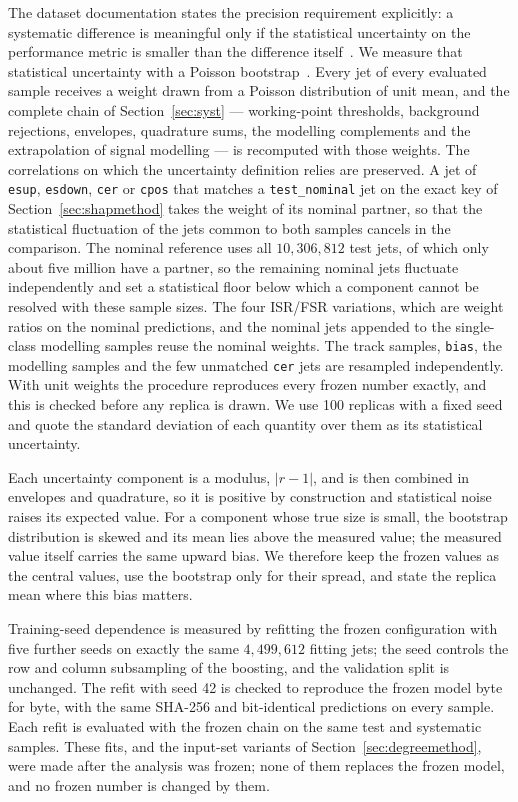 \documentclass[pdflatex,sn-mathphys,Numbered,iicol]{sn-jnl}
\begin{document}
The dataset documentation states the precision requirement explicitly: a systematic
difference is meaningful only if the statistical uncertainty on the performance metric
is smaller than the difference itself~\cite{ATLASGitLab}. We measure that statistical
uncertainty with a Poisson bootstrap~\cite{Efron1979,Hanley2006}. Every jet of every
evaluated sample receives a weight drawn from a Poisson distribution of unit mean, and
the complete chain of Section~\ref{sec:syst} --- working-point thresholds, background
rejections, envelopes, quadrature sums, the modelling complements and the extrapolation
of signal modelling --- is recomputed with those weights. The correlations on which the
uncertainty definition relies are preserved. A jet of \texttt{esup}, \texttt{esdown},
\texttt{cer} or \texttt{cpos} that matches a \texttt{test\_nominal} jet on the exact key
of Section~\ref{sec:shapmethod} takes the weight of its nominal partner, so that the statistical fluctuation of the
jets common to both samples cancels in the comparison. The nominal reference uses all
$10{,}306{,}812$ test jets, of which only about five million have a partner, so the
remaining nominal jets fluctuate independently and set a statistical floor below which
a component cannot be resolved with these sample sizes. The four
ISR/FSR variations, which are weight ratios on the nominal predictions, and the nominal
jets appended to the single-class modelling samples reuse the nominal weights. The track
samples, \texttt{bias}, the modelling samples and the few unmatched \texttt{cer} jets are
resampled independently. With unit weights the procedure reproduces every frozen number
exactly, and this is checked before any replica is drawn. We use 100 replicas with a
fixed seed and quote the standard deviation of each quantity over them as its
statistical uncertainty.

Each uncertainty component is a modulus, $|r-1|$, and is then combined in envelopes and
quadrature, so it is positive by construction and statistical noise raises its expected
value. For a component whose true size is small, the bootstrap distribution is skewed
and its mean lies above the measured value; the measured value itself carries the same
upward bias. We therefore keep the frozen values as the
central values, use the bootstrap only for their spread, and state the replica mean where
this bias matters.

Training-seed dependence is measured by refitting the frozen configuration with five
further seeds on exactly the same $4{,}499{,}612$ fitting jets; the seed controls the row
and column subsampling of the boosting, and the validation split is unchanged. The refit
with seed 42 is checked to reproduce the frozen model byte for byte, with the same
SHA-256 and bit-identical predictions on every sample. Each refit is evaluated with the
frozen chain on the same test and systematic samples. These fits, and the input-set
variants of Section~\ref{sec:degreemethod}, were made after the analysis was frozen;
none of them replaces the frozen model, and no frozen number is changed by them.
\end{document}
